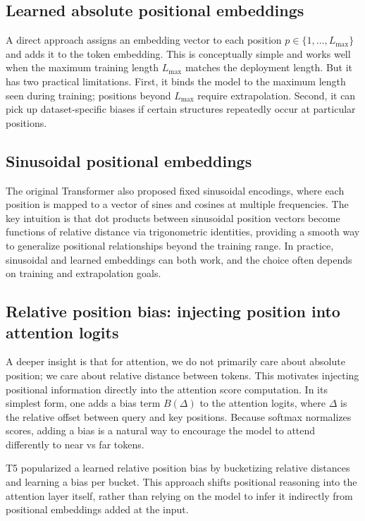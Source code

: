 \subsection{Learned absolute positional embeddings}
A direct approach assigns an embedding vector to each position \(p \in \{1,\dots,L_{\max}\}\) and adds it to the token embedding. This is conceptually simple and works well when the maximum training length \(L_{\max}\) matches the deployment length. But it has two practical limitations. First, it binds the model to the maximum length seen during training; positions beyond \(L_{\max}\) require extrapolation. Second, it can pick up dataset-specific biases if certain structures repeatedly occur at particular positions.

\subsection{Sinusoidal positional embeddings}
The original Transformer also proposed fixed sinusoidal encodings, where each position is mapped to a vector of sines and cosines at multiple frequencies. The key intuition is that dot products between sinusoidal position vectors become functions of relative distance via trigonometric identities, providing a smooth way to generalize positional relationships beyond the training range. In practice, sinusoidal and learned embeddings can both work, and the choice often depends on training and extrapolation goals.

\subsection{Relative position bias: injecting position into attention logits}
A deeper insight is that for attention, we do not primarily care about absolute position; we care about relative distance between tokens. This motivates injecting positional information directly into the attention score computation. In its simplest form, one adds a bias term \(B(\Delta)\) to the attention logits, where \(\Delta\) is the relative offset between query and key positions. Because softmax normalizes scores, adding a bias is a natural way to encourage the model to attend differently to near vs far tokens.

T5 popularized a learned relative position bias by bucketizing relative distances and learning a bias per bucket. This approach shifts positional reasoning into the attention layer itself, rather than relying on the model to infer it indirectly from positional embeddings added at the input.

